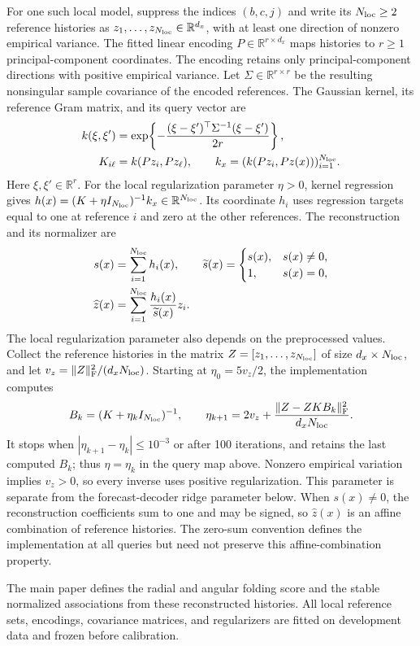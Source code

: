 For one such local model, suppress the indices $(b,c,j)$ and write its
$N_{\rm loc}\geq2$ reference histories as
$z_1,\ldots,z_{N_{\rm loc}}\in\mathbb R^{d_x}$, with at least one direction of
nonzero empirical variance. The fitted linear encoding
$P\in\mathbb R^{r\times d_x}$ maps histories to
$r\geq1$ principal-component coordinates. The encoding retains only principal-component directions with positive empirical
variance. Let $\Sigma\in\mathbb R^{r\times r}$ be the resulting nonsingular
sample covariance of the encoded references. The Gaussian
kernel, its reference Gram matrix, and its query vector are
\begin{align*}
 k(\xi,\xi')&=\exp\!\left\{-\frac{(\xi-\xi')^\top\Sigma^{-1}
                                  (\xi-\xi')}{2r}\right\},\\
 K_{i\ell}&=k(Pz_i,Pz_\ell),\qquad
 k_x=(k(Pz_i,Pz(x)))_{i=1}^{N_{\rm loc}}.
\end{align*}
Here $\xi,\xi'\in\mathbb R^r$. For the local regularization parameter
$\eta>0$, kernel regression gives
$h(x)=(K+\eta I_{N_{\rm loc}})^{-1}k_x\in\mathbb R^{N_{\rm loc}}$.
Its coordinate $h_i$ uses regression targets equal to one at reference $i$
and zero at the other references. The reconstruction and its normalizer are
\begin{align*}
 s(x)&=\sum_{i=1}^{N_{\rm loc}}h_i(x),\qquad
 \widetilde s(x)=
 \begin{cases}s(x),&s(x)\ne0,\\1,&s(x)=0,\end{cases}\\
 \widehat z(x)&=\sum_{i=1}^{N_{\rm loc}}
                   \frac{h_i(x)}{\widetilde s(x)}z_i.
\end{align*}
The local regularization parameter also depends on the preprocessed values.
Collect the reference histories in the matrix
$Z=[z_1,\ldots,z_{N_{\rm loc}}]$ of size $d_x\times N_{\rm loc}$,
and let $v_z=\|Z\|_{\rm F}^2/(d_xN_{\rm loc})$. Starting at
$\eta_0=5v_z/2$, the implementation computes
\[
 B_k=(K+\eta_k I_{N_{\rm loc}})^{-1},\qquad
 \eta_{k+1}=2v_z+
       \frac{\|Z-ZKB_k\|_{\rm F}^2}{d_xN_{\rm loc}}.
\]
It stops when $|\eta_{k+1}-\eta_k|\leq10^{-3}$ or after 100 iterations,
and retains the last computed $B_k$; thus $\eta=\eta_k$ in the query map
above. Nonzero empirical variation implies $v_z>0$, so every inverse uses
positive regularization. This parameter is separate from the
forecast-decoder ridge parameter below.
When $s(x)\ne0$, the reconstruction coefficients sum to one and may be signed,
so $\widehat z(x)$ is an affine combination of reference histories. The
zero-sum convention defines the implementation at all queries but need not
preserve this affine-combination property.


The main paper defines the radial and angular folding score and the stable
normalized associations from these reconstructed histories. All local reference
sets, encodings, covariance matrices, and regularizers are fitted on development
data and frozen before calibration.
